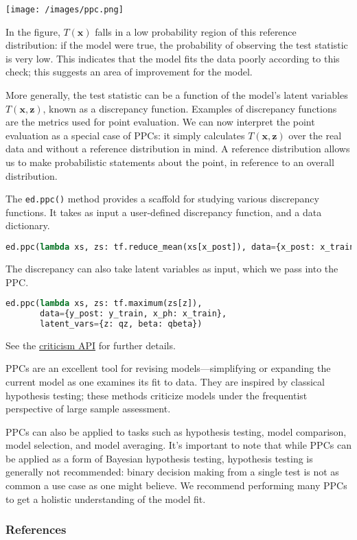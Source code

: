 \texttt{[image: /images/ppc.png]}

In the figure, $T(\mathbf{x})$ falls in a low probability region of
this reference distribution: if the model were true, the probability
of observing the test statistic is very low. This indicates that the
model fits the data poorly according to this check; this suggests an
area of improvement for the model.

More generally, the test statistic can be a function of the
model's latent variables $T(\mathbf{x}, \mathbf{z})$, known as a
discrepancy function.  Examples of discrepancy functions are the
metrics used for point evaluation. We can now interpret the
point evaluation as a special case of PPCs: it simply calculates
$T(\mathbf{x}, \mathbf{z})$ over the real data and without a reference
distribution in mind. A reference distribution allows us to make
probabilistic statements about the point, in reference to an overall
distribution.

The \texttt{ed.ppc()} method provides a scaffold for studying various
discrepancy functions. It takes as input a user-defined discrepancy
function, and a data dictionary.
\begin{lstlisting}[language=Python]
ed.ppc(lambda xs, zs: tf.reduce_mean(xs[x_post]), data={x_post: x_train})
\end{lstlisting}
The discrepancy can also take latent variables as input, which we pass
into the PPC.
\begin{lstlisting}[language=Python]
ed.ppc(lambda xs, zs: tf.maximum(zs[z]),
       data={y_post: y_train, x_ph: x_train},
       latent_vars={z: qz, beta: qbeta})
\end{lstlisting}

See the \href{/api/criticism}{criticism API} for further details.

PPCs are an excellent tool for revising models---simplifying or
expanding the current model as one examines its fit to data.
They are inspired by classical hypothesis testing; these methods
criticize models under the frequentist perspective of large sample
assessment.

PPCs can also be applied to tasks such as hypothesis testing, model
comparison, model selection, and model averaging.  It's important to
note that while PPCs can be applied as a form of Bayesian hypothesis
testing, hypothesis testing is generally not recommended: binary
decision making from a single test is not as common a use case as one
might believe. We recommend performing many PPCs to get a holistic
understanding of the model fit.

\subsubsection{References}\label{references}
